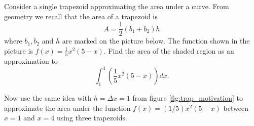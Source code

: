\begin{problem}
    Consider a single trapezoid approximating the area under a curve.  From geometry we
    recall that the area of a trapezoid is 
    \[ A = \frac{1}{2}\left( b_1 + b_2 \right) h \]
    where $b_1, b_2$ and $h$ are marked on the picture below.  The function shown in the
    picture is $f(x) = \frac{1}{5} x^2 (5-x)$.  Find the area of the shaded region as an
    approximation to
    \[ \int_1^4 \left( \frac{1}{5} x^2 (5-x) \right) dx. \]
    \begin{center}
    \end{center}
\end{problem}

\begin{problem}
    Now use the same idea with $h = \Delta x = 1$ from figure \ref{fig:trap_motivation} to
    approximate the area under the function $f(x) = (1/5)x^2(5-x)$ between $x=1$ and $x=4$
    using three trapezoids.
\end{problem}

